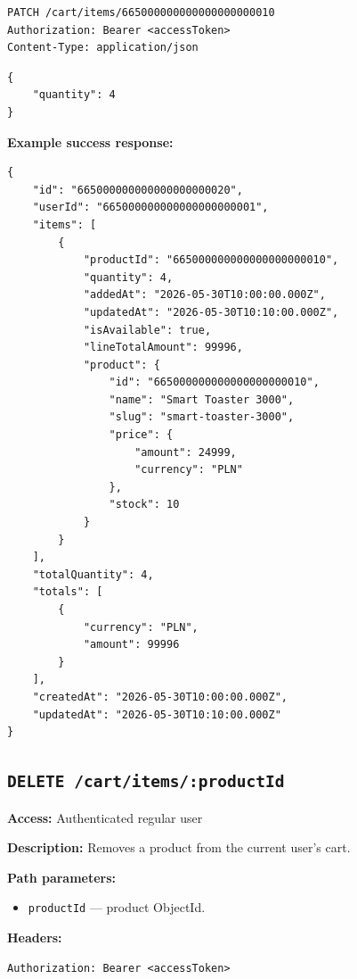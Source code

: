 \begin{verbatim}
PATCH /cart/items/665000000000000000000010
Authorization: Bearer <accessToken>
Content-Type: application/json
\end{verbatim}

\begin{verbatim}
{
    "quantity": 4
}
\end{verbatim}

\pagebreak
\textbf{Example success response:}

\begin{verbatim}
{
    "id": "665000000000000000000020",
    "userId": "665000000000000000000001",
    "items": [
        {
            "productId": "665000000000000000000010",
            "quantity": 4,
            "addedAt": "2026-05-30T10:00:00.000Z",
            "updatedAt": "2026-05-30T10:10:00.000Z",
            "isAvailable": true,
            "lineTotalAmount": 99996,
            "product": {
                "id": "665000000000000000000010",
                "name": "Smart Toaster 3000",
                "slug": "smart-toaster-3000",
                "price": {
                    "amount": 24999,
                    "currency": "PLN"
                },
                "stock": 10
            }
        }
    ],
    "totalQuantity": 4,
    "totals": [
        {
            "currency": "PLN",
            "amount": 99996
        }
    ],
    "createdAt": "2026-05-30T10:00:00.000Z",
    "updatedAt": "2026-05-30T10:10:00.000Z"
}
\end{verbatim}

\subsection{\texttt{DELETE /cart/items/:productId}}

\textbf{Access:} Authenticated regular user

\textbf{Description:} Removes a product from the current user's cart.

\textbf{Path parameters:}

\begin{itemize}
    \item \texttt{productId} --- product ObjectId.
\end{itemize}

\textbf{Headers:}

\begin{verbatim}
Authorization: Bearer <accessToken>
\end{verbatim}

